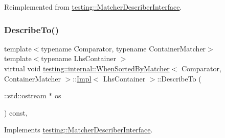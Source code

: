 Reimplemented from \hyperlink{classtesting_1_1_matcher_describer_interface_a2071afbc47097c4d1c0064275af34db0}{testing\+::\+Matcher\+Describer\+Interface}.

\mbox{\label{classtesting_1_1internal_1_1_when_sorted_by_matcher_1_1_impl_a33f7b8bdce4adb02618e90ac2ec949f9}} 
\subsubsection{\texorpdfstring{Describe\+To()}{DescribeTo()}}
{\footnotesize\ttfamily template$<$typename Comparator, typename Container\+Matcher$>$ \\
template$<$typename Lhs\+Container $>$ \\
virtual void \hyperlink{classtesting_1_1internal_1_1_when_sorted_by_matcher}{testing\+::internal\+::\+When\+Sorted\+By\+Matcher}$<$ Comparator, Container\+Matcher $>$\+::\hyperlink{classtesting_1_1internal_1_1_when_sorted_by_matcher_1_1_impl}{Impl}$<$ Lhs\+Container $>$\+::Describe\+To (\begin{DoxyParamCaption}\item[{\+::std\+::ostream $\ast$}]{os }\end{DoxyParamCaption}) const\hspace{0.3cm}{\ttfamily [inline]}, {\ttfamily [virtual]}}



Implements \hyperlink{classtesting_1_1_matcher_describer_interface_ad9f861588bd969b6e3e717f13bb94e7b}{testing\+::\+Matcher\+Describer\+Interface}.

\mbox{\label{classtesting_1_1internal_1_1_when_sorted_by_matcher_1_1_impl_a9d8f57c729df8c041f2fd7febbc950da}} 
